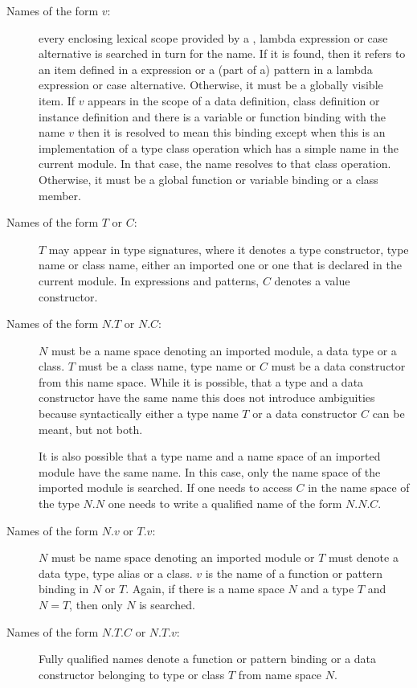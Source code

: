 \begin{description}
\item [Names of the form $v$:] every enclosing lexical scope provided by a , lambda expression or case alternative is searched in turn for the name.  If it is found, then it refers to an item defined in a  expression or a (part of a) pattern in a lambda expression or case alternative. Otherwise, it must be a globally visible item. If $v$ appears in the scope of a data definition, class definition or instance definition and there is a variable or function binding with the name $v$ then it is resolved to mean this binding except when this is an implementation of a type class operation which has a simple name in the current module. In that case, the name resolves to that class operation. Otherwise, it must be a global function or variable binding or a class member.
\item [Names of the form $T$ or $C$:] $T$ may appear in type signatures, where it denotes a type constructor, type name or class name, either an imported one or one that is declared in the current module. In expressions and patterns, $C$ denotes a value constructor.
\item[Names of the form $N$.$T$ or $N$.$C$:] $N$ must be a name space denoting an imported module, a data type or a class. $T$ must be a class name, type name or $C$ must be a data constructor from this name space. While it is possible, that a type and a data constructor have the same name this does not introduce ambiguities because syntactically either a type name $T$ or a data constructor $C$ can be meant, but not both.

It is also possible that a type name and a name space of an imported module have the same name. In this case, only the name space of the imported module is searched. If one needs to access $C$ in the name space of the type $N$.$N$ one needs to write a qualified name of the form $N$.$N$.$C$.
\item[Names of the form $N$.$v$ or $T$.$v$:]
$N$ must be name space denoting an imported module or $T$ must denote a data type, type alias or a class.
$v$ is the name of a function or pattern binding in $N$ or $T$. Again, if there is a name space $N$ and a type $T$ and $N = T$, then only $N$ is searched.
\item[Names of the form $N$.$T$.$C$ or $N$.$T$.$v$:] Fully qualified names denote a function or pattern binding or a data constructor belonging to type or class $T$ from name space $N$.
\end{description}

